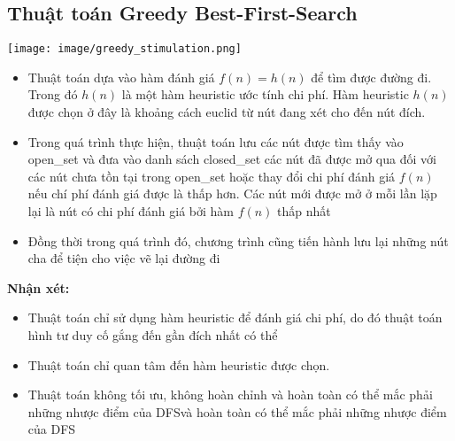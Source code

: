 \documentclass{article}
\begin{document}
\subsection{Thuật toán Greedy Best-First-Search}
    \centerline{\texttt{[image: image/greedy\_stimulation.png]}}
    \vspace{2\baselineskip}
    \begin{itemize}
        \item Thuật toán dựa vào hàm đánh giá $f(n) = h(n)$ để tìm được đường đi. Trong đó $h(n)$ là một hàm heuristic ước tính chi phí. Hàm heuristic $h(n)$ được chọn ở đây là khoảng cách euclid từ nút đang xét cho đến nút đích. 
        \item Trong quá trình thực hiện, thuật toán lưu các nút được tìm thấy vào open\_set và đưa vào danh sách closed\_set các nút đã được mở qua đối với các nút chưa tồn tại trong open\_set hoặc thay đổi chi phí đánh giá $f(n)$ nếu chí phí đánh giá được là thấp hơn. Các nút mới được mở ở mỗi lần lặp lại là nút có chi phí đánh giá bởi hàm $f(n)$ thấp nhất
        \item Đồng thời trong quá trình đó, chương trình cũng tiến hành lưu lại những nút cha để tiện cho việc vẽ lại đường đi
    \end{itemize}
    \textbf{Nhận xét: }
    \begin{itemize}
        \item Thuật toán chỉ sử dụng hàm heuristic để đánh giá chi phí, do đó thuật toán hình tư duy cố gắng đến gần đích nhất có thể
        \item Thuật toán chỉ quan tâm đến hàm heuristic được chọn.
        \item Thuật toán không tối ưu, không hoàn chỉnh và hoàn toàn có thể mắc phải những nhược điểm của DFSvà hoàn toàn có thể mắc phải những nhược điểm của DFS
    \end{itemize}
\end{document}
